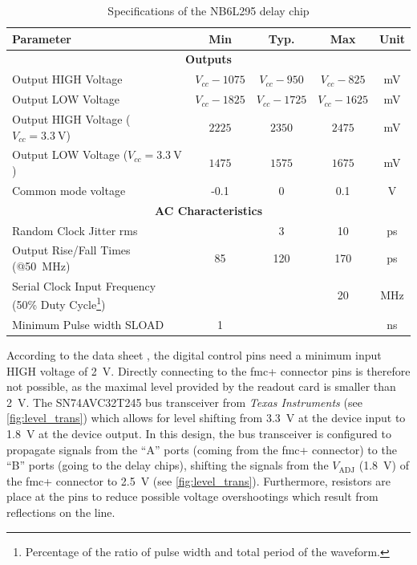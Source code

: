 \begin{table}[tbh]
	\caption[NB6L295 Characteristics]{Specifications of the NB6L295 delay chip \cite{NB6L295}}
	\label{tab:nb6l295}
	\begin{minipage}{\textwidth}
		\centering
		\begin{tabularx}{\textwidth}{Xcccc}
			\toprule
			\textbf{Parameter} & \textbf{Min} & \textbf{Typ.} & \textbf{Max} & \textbf{Unit}\\
			\midrule
			\multicolumn{5}{c}{\textbf{Outputs}}  \\
			Output HIGH Voltage & $V_{cc} - 1075$ & $V_{cc} - 950$ & $V_{cc} - 825$ & mV\\
			Output LOW Voltage & $V_{cc} - 1825$ & $V_{cc} - 1725$ & $V_{cc} - 1625$ & mV\\
			Output HIGH Voltage ($V_{cc}=\SI{3.3}{\volt}$) & $2225$ & $2350$ & $2475$ & mV\\
			Output LOW Voltage ($V_{cc}=\SI{3.3}{\volt}$) & $1475$ & $1575$ & $1675$ & mV\\
			Common mode voltage & -0.1 & 0 & 0.1 & V\\[0.3cm]
			\multicolumn{5}{c}{\textbf{AC Characteristics}}  \\
			Random Clock Jitter \gls{rms}&  & 3 & 10 & ps\\
			Output Rise/Fall Times (@\SI{50}{\mega \hertz}) & 85 & 120 & 170 & ps\\
			Serial Clock Input Frequency (50\% Duty Cycle\footnote{Percentage of the ratio of pulse width and total period of the waveform.}) &  &  & 20 & MHz\\
			Minimum Pulse width SLOAD  & 1 &  &  & ns\\
			\bottomrule
		\end{tabularx}
	\end{minipage}
\end{table}
According to the data sheet \cite{NB6L295}, the digital control pins need a minimum input HIGH voltage of \SI{2}{\volt}.
Directly connecting to the \gls{fmc}+ connector pins is therefore not possible, as the maximal level provided by the readout card is smaller than \SI{2}{\volt}.
The SN74AVC32T245 bus transceiver from \textit{Texas Instruments} (see \autoref{fig:level_trans}) which allows for level shifting from \SI{3.3}{\volt} at the device input to \SI{1.8}{\volt} at the device output.
In this design, the bus transceiver is configured to propagate signals from the ``A'' ports (coming from the \gls{fmc}+ connector) to the ``B'' ports (going to the delay chips), shifting the signals from the $V_\text{ADJ}$ (\SI{1.8}{\volt}) of the \gls{fmc}+ connector to \SI{2.5}{\volt} (see \autoref{fig:level_trans}).
Furthermore, resistors are place at the pins to reduce possible voltage overshootings which result from reflections on the line. 

